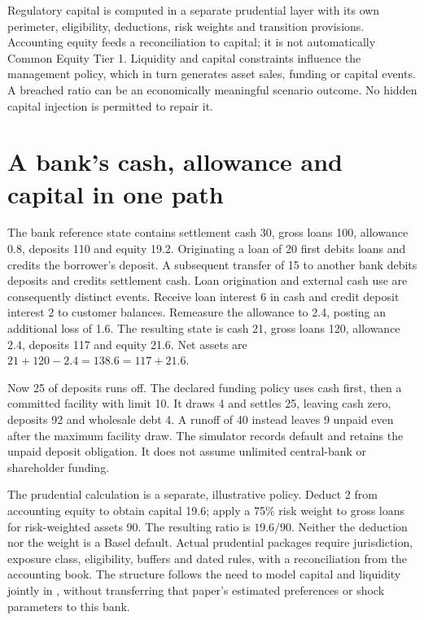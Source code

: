 Regulatory capital is computed in a separate prudential layer with its own
perimeter, eligibility, deductions, risk weights and transition provisions.
Accounting equity feeds a reconciliation to capital; it is not automatically
Common Equity Tier 1. Liquidity and capital constraints influence the
management policy, which in turn generates asset sales, funding or capital
events. A breached ratio can be an economically meaningful scenario outcome.
No hidden capital injection is permitted to repair it.

\section{A bank's cash, allowance and capital in one path}

The bank reference state contains settlement cash 30, gross loans 100,
allowance 0.8, deposits 110 and equity 19.2. Originating a loan of 20 first
debits loans and credits the borrower's deposit. A subsequent transfer of 15
to another bank debits deposits and credits settlement cash. Loan origination
and external cash use are consequently distinct events. Receive loan interest
6 in cash and credit deposit interest 2 to customer balances. Remeasure the
allowance to 2.4, posting an additional loss of 1.6. The resulting state is
cash 21, gross loans 120, allowance 2.4, deposits 117 and equity 21.6.
Net assets are $21+120-2.4=138.6=117+21.6$.

Now 25 of deposits runs off. The declared funding policy uses cash first,
then a committed facility with limit 10. It draws 4 and settles 25, leaving
cash zero, deposits 92 and wholesale debt 4. A runoff of 40 instead leaves
9 unpaid even after the maximum facility draw. The simulator records default
and retains the unpaid deposit obligation. It does not assume unlimited
central-bank or shareholder funding.

The prudential calculation is a separate, illustrative policy. Deduct 2 from
accounting equity to obtain capital 19.6; apply a 75\% risk weight to gross
loans for risk-weighted assets 90. The resulting ratio is $19.6/90$.
Neither the deduction nor the weight is a Basel default. Actual prudential
packages require jurisdiction, exposure class, eligibility, buffers and dated
rules, with a reconciliation from the accounting book. The structure follows
the need to model capital and liquidity jointly in
\citet[Section 2]{behn2019}, without transferring that paper's estimated
preferences or shock parameters to this bank.

